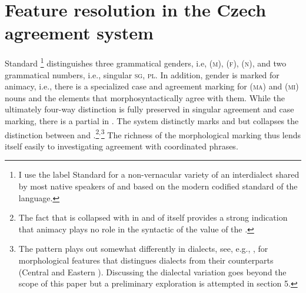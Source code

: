 \documentclass[output=paper,modfontsnewtxmath,hidelinks]{langscibook}
\begin{document}
\section{Feature resolution in the Czech agreement system}
\label{sec:featureResolution}

Standard \footnote{I use the label Standard  for a non-vernacular variety of an interdialect shared by most native speakers of  and based on the modern codified standard of the  language.} distinguishes three grammatical genders, i.e,  (\textsc{m}),  (\textsc{f}),  (\textsc{n}), and two grammatical numbers, i.e., singular \textsc{sg},  \textsc{pl}. In addition,  gender is marked for animacy, i.e., there is a specialized case and agreement marking for  (\textsc{ma}) and  (\textsc{mi})  nouns and the elements that morphosyntactically agree with them. While the ultimately four-way distinction is fully preserved in singular agreement and case marking, there is a partial  in . The system distinctly marks   and    but collapses the distinction between   and .\footnote{The fact that  is collapsed with   in and of itself provides a strong indication that animacy plays no role in the syntactic  of the  value of the .}$^,$\footnote{The  pattern plays out somewhat differently in dialects, see, e.g., \citet[392--404]{KarlikEtAl:2002}, for morphological features that distingues  dialects from their  counterparts (Central and Eastern ). Discussing the dialectal variation goes beyond the scope of this paper but a preliminary exploration is attempted in section 5.} The richness of the morphological marking thus lends itself easily to investigating agreement with coordinated  phrases.
\end{document}

